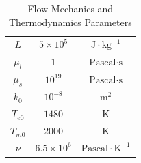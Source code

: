 \begin{table}[htb]
\begin{tabular}{c | c c}
		  $L$            & $5\times10^{5}$  & $\text{J}\cdot \text{kg}^{-1}$              \\
		  $\mu_l$        & $1$              & $\text{Pascal} \cdot \text{s}$       \\
		  $\mu_s$        & $10^{19}$        & $\text{Pascal} \cdot \text{s}$       \\
		  $k_0$          & $10^{-8}$        & $\text{m}^2$                         \\
		  $T_{e0}$       & $1480$           & $\text{K}$                           \\
		  $T_{m0}$       & $2000$           & $\text{K}$                           \\
		  $\nu$          & $6.5\times10^6$  & $\text{Pascal} \cdot \text{K}^{-1}$
\end{tabular}
\caption[Parameters Table]{Flow Mechanics and Thermodynamics Parameters}
\label{tab:parameters}
\end{table}
